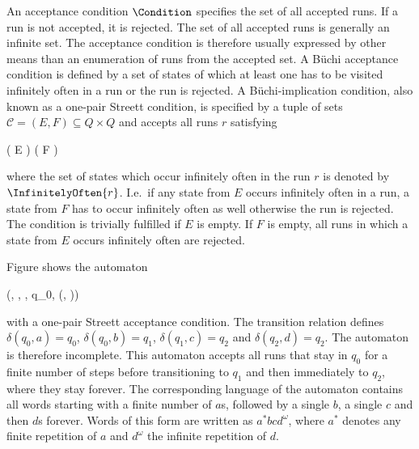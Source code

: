 \startsubsection[title={Acceptance Conditions},reference=sec:theory-automata-acceptance]

    An acceptance condition $\Condition$ specifies the set of all accepted runs.
    If a run is not accepted, it is rejected.
    The set of all accepted runs is generally an infinite set.
    The acceptance condition is therefore usually expressed by other means than an enumeration of runs from the accepted set.
    A Büchi acceptance condition is defined by a set of states of which at least one has to be visited infinitely often in a run or the run is rejected.
    A Büchi-implication condition, also known as a one-pair Streett condition, is specified by a tuple of sets $\mathcal{C} = (E, F) \subseteq Q \times Q$ and accepts all runs $r$ satisfying

    \startformula
        ( \cap E \ne \emptyset) \Longrightarrow ( \cap F \ne \emptyset) \EndComma
    \stopformula

    where the set of states which occur infinitely often in the run $r$ is denoted by $\InfinitelyOften{r}$.
    I.e.\, if any state from $E$ occurs infinitely often in a run, a state from $F$ has to occur infinitely often as well otherwise the run is rejected.
    The condition is trivially fulfilled if $E$ is empty.
    If $F$ is empty, all runs in which a state from $E$ occurs infinitely often are rejected.


    Figure  shows the automaton

    \startformula
        (, , \Transition, q_0, (, ))
    \stopformula

    with a one-pair Streett acceptance condition.
    The transition relation defines $\delta(q_0, a) = q_0$, $\delta(q_0, b) = q_1$, $\delta(q_1, c) = q_2$ and $\delta(q_2, d) = q_2$.
    The automaton is therefore incomplete.
    This automaton accepts all runs that stay in $q_0$ for a finite number of steps before transitioning to $q_1$ and then immediately to $q_2$, where they stay forever.
    The corresponding language of the automaton contains all words starting with a finite number of $a$s, followed by a single $b$, a single $c$ and then $d$s forever.
    Words of this form are written as $a^\ast b c d^\omega$, where $a^\ast$ denotes any finite repetition of $a$ and $d^\omega$ the infinite repetition of $d$.

\stopsubsection

